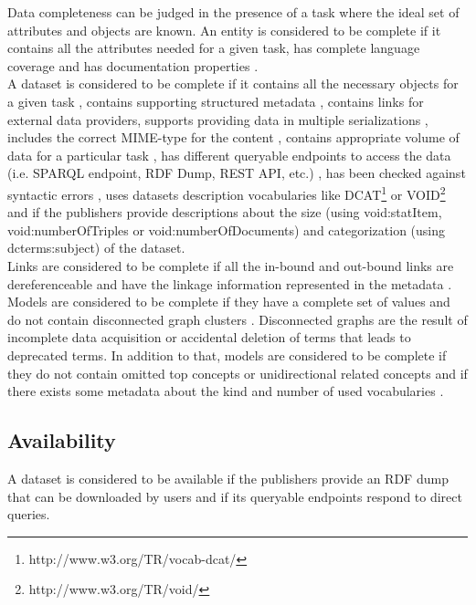 \documentclass[onecolumn, crcready]{iosart2c}
\begin{document}
Data completeness can be judged in the presence of a task where the ideal set of attributes and objects are known. An entity is considered to be complete if it contains all the attributes needed for a given task, has complete language coverage \cite{Mader2012} and has documentation properties \cite{w3c_skos_rec}\cite{Mader2012}.\\ A dataset is considered to be complete if it contains all the necessary objects for a given task \cite{Mendes2012}, contains supporting structured metadata \cite{Hogan2010}, contains links for external data providers, supports providing data in multiple serializations \cite{Framework2012}, includes the correct MIME-type for the content \cite{Hogan2010}, contains appropriate volume of data for a particular task \cite{Framework2012}, has different queryable endpoints to access the data (i.e. SPARQL endpoint, RDF Dump, REST API, etc.) \cite{Framework2012}, has been checked against syntactic errors \cite{Hogan2010}, uses datasets description vocabularies like DCAT\footnote{http://www.w3.org/TR/vocab-dcat/} or VOID\footnote{http://www.w3.org/TR/void/} and if the publishers provide descriptions about the size (using void:statItem, void:numberOfTriples or void:numberOfDocuments) and categorization (using dcterms:subject) of the dataset.\\ Links are considered to be complete if all the in-bound and out-bound links are dereferenceable \cite{Hogan2010}\cite{Mader2012}\cite{Gueret2012} and have the linkage information represented in the metadata \cite{Hogan2010}.\\ Models are considered to be complete if they have a complete set of values \cite{Mader2012} and do not contain disconnected graph clusters \cite{Mader2012}. Disconnected graphs are the result of incomplete data acquisition or accidental deletion of terms that leads to deprecated terms. In addition to that, models are considered to be complete if they do not contain omitted top concepts or unidirectional related concepts \cite{Hogan2010} and if there exists some metadata about the kind and number of used vocabularies \cite{Framework2012}.

\subsection{Availability}

A dataset is considered to be available if the publishers provide an RDF dump that can be downloaded by users \cite{flemming2010}\cite{Hogan2010} and if its queryable endpoints respond to direct queries.
\end{document}
